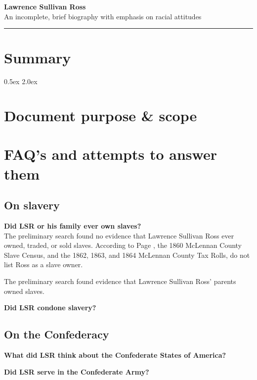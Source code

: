 \documentclass[12pt]{article}
\begin{document}
\Large{\textbf{Lawrence Sullivan Ross \\}}
\large{An incomplete, brief biography with emphasis on racial attitudes \\}
\rule{\textwidth}{1pt}

\section{Summary}

\parskip 0.5ex
\newpage
\tableofcontents
\parskip 2.0ex

\newpage
\section{Document purpose \& scope}

\newpage
\section{FAQ's and attempts to answer them}

\subsection{On slavery}
\textbf{Did LSR or his family ever own slaves? \\ }
The preliminary search found no evidence that Lawrence Sullivan Ross ever owned, traded, or sold slaves. According to Page \cite{page}, the 1860 McLennan County Slave Census, and the 1862, 1863, and 1864 McLennan County Tax Rolls, do not list Ross as a slave owner.

The preliminary search found evidence that Lawrence Sullivan Ross' parents owned slaves. 

\textbf{Did LSR condone slavery? \\ }

\subsection{On the Confederacy}
\textbf{What did LSR think about the Confederate States of America? \\}

\textbf{Did LSR serve in the Confederate Army? \\ }
\end{document}
